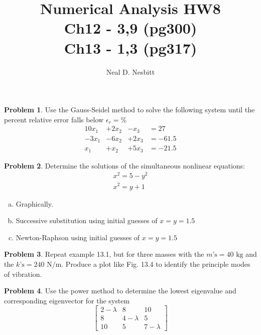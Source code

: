 \documentclass{article}
\title{Numerical Analysis HW8\\
Ch12 - 3,9 (pg300)\\
Ch13 - 1,3 (pg317)\\}
\author{Neal D. Nesbitt}
\begin{document}
\maketitle

\theoremstyle{definition}
\newtheorem{problem}{Problem}
\newtheorem{solution}{Solution}[problem]


\setcounter{problem}{2}
\begin{problem}
Use the Gauss-Seidel method to solve the following system until the percent relative error falls below $\epsilon_{r}= \%$\\
\[
\begin{matrix}
10x_{1}	&+2x_{2}	&-x_{3}	&=	27\\
-3x_{1}	&-6x_{2}	&+2x_{3}	&=	-61.5\\
x_{1}	&+x_{2}	&+5x_{3}	&=	-21.5
\end{matrix}
\]
\end{problem}

\setcounter{problem}{8}
\begin{problem}
Determine the solutions of the simultaneous nonlinear equations:\\
\[ 
\begin{matrix}
x^{2} = 5-y^{2}\\
x^{2} = y+1
\end{matrix}
\]
\begin{enumerate}[(a)]
\item Graphically.
\item Successive substitution using initial guesses of $x=y=1.5$
\item Newton-Raphson using initial guesses of $x=y=1.5$
\end{enumerate}
\end{problem}

\setcounter{problem}{0}
\begin{problem}
Repeat example 13.1, but for three masses with the $m\text{'s}=40\text{ kg}$ and the $k\text{'s}=240\text{ N/m}$. Produce a plot like Fig. 13.4 to identify the principle modes of vibration.
\end{problem}

\setcounter{problem}{2}
\begin{problem}
Use the power method to determine the lowest eigenvalue and corresponding eigenvector for the system
\[
\begin{bmatrix}
2-\lambda	&	8			&	10			\\
8			&	4-\lambda	&	5			\\
10			&	5			&	7-\lambda
\end{bmatrix}
\]
\end{problem}
\end{document}

